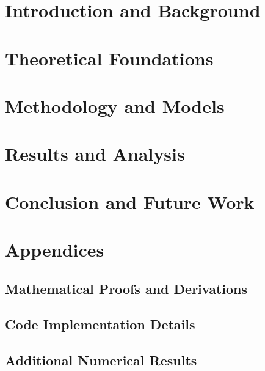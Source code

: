\documentclass[11pt]{report}
\begin{document}
\partfont{\color{black}}
\chapterfont{\color{black}}
\sectionfont{\color{blue}\scshape}
\subsectionfont{\color{blue}}
\subsubsectionfont{\color{black}}

    
\newpage
\part{Introduction and Background}
    

\part{Theoretical Foundations}
    
        

\part{Methodology and Models}
    
        
\part{Results and Analysis}

\part{Conclusion and Future Work}
    
\appendix
\part{Appendices}
    \chapter{Mathematical Proofs and Derivations}
    \chapter{Code Implementation Details}
    \chapter{Additional Numerical Results}
      
\newpage

\end{document}
